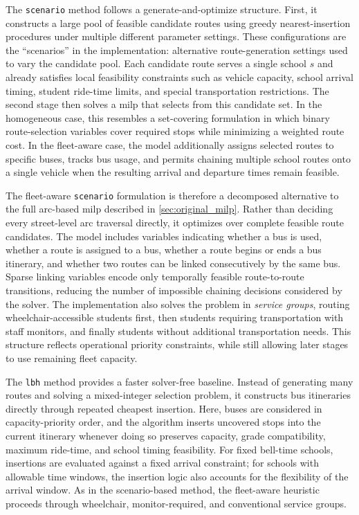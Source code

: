 The \verb!scenario! method follows a generate-and-optimize structure. First, it constructs a large pool of feasible candidate routes using greedy nearest-insertion procedures under multiple different parameter settings. These configurations are the ``scenarios'' in the implementation: alternative route-generation settings used to vary the candidate pool. Each candidate route serves a single school $s$ and already satisfies local feasibility constraints such as vehicle capacity, school arrival timing, student ride-time limits, and special transportation restrictions. The second stage then solves a \gls{milp} that selects from this candidate set. In the homogeneous case, this resembles a set-covering formulation in which binary route-selection variables cover required stops while minimizing a weighted route cost. In the fleet-aware case, the model additionally assigns selected routes to specific buses, tracks bus usage, and permits chaining multiple school routes onto a single vehicle when the resulting arrival and departure times remain feasible.

The fleet-aware \verb!scenario! formulation is therefore a decomposed alternative to the full arc-based \gls{milp} described in \autoref{sec:original_milp}. Rather than deciding every street-level arc traversal directly, it optimizes over complete feasible route candidates. The model includes variables indicating whether a bus is used, whether a route is assigned to a bus, whether a route begins or ends a bus itinerary, and whether two routes can be linked consecutively by the same bus. Sparse linking variables encode only temporally feasible route-to-route transitions, reducing the number of impossible chaining decisions considered by the solver. The implementation also solves the problem in \textit{service groups}, routing wheelchair-accessible students first, then students requiring transportation with staff monitors, and finally students without additional transportation needs. This structure reflects operational priority constraints, while still allowing later stages to use remaining fleet capacity.

The \verb!lbh! method provides a faster solver-free baseline. Instead of generating many routes and solving a mixed-integer selection problem, it constructs bus itineraries directly through repeated cheapest insertion. Here, buses are considered in capacity-priority order, and the algorithm inserts uncovered stops into the current itinerary whenever doing so preserves capacity, grade compatibility, maximum ride-time, and school timing feasibility. For fixed bell-time schools, insertions are evaluated against a fixed arrival constraint; for schools with allowable time windows, the insertion logic also accounts for the flexibility of the arrival window. As in the scenario-based method, the fleet-aware heuristic proceeds through wheelchair, monitor-required, and conventional service groups.

